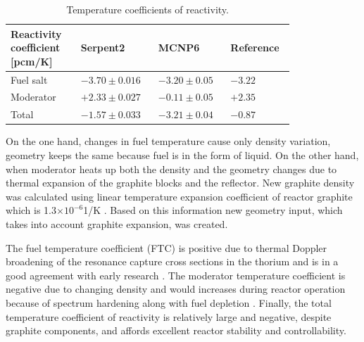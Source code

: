 \documentclass{anstrans}
\begin{document}
\captionsetup[table]{
  labelsep = newline,
  name = TABLE, 
  justification=justified,
  singlelinecheck=false,%
  labelsep=colon,%
  skip = \medskipamount}
\begin{table}[h!]
  \caption{Temperature coefficients of reactivity.}
\begin{tabular}{p{0.22\linewidth} p{0.22\linewidth} p{0.21\linewidth} p{0.15\linewidth}} \toprule
   Reactivity coefficient [pcm/K]  & Serpent2      & MCNP6 \cite{park_whole_2015}   & Reference \cite{robertson_conceptual_1971}      
\\ \midrule
Fuel salt        & $-3.70\pm0.016$ & $-3.20\pm0.05$ & $-3.22$ 
\\ \midrule
Moderator        & $+2.33\pm0.027$ & $-0.11\pm0.05$ & $+2.35$ 
\\ \midrule
Total            & $-1.57\pm0.033$ & $-3.21\pm0.04$ & $-0.87$ 
\\
\bottomrule
\end{tabular}
  \label{tab:tcoef}
\end{table}
On the one hand, changes in fuel temperature cause only density variation, geometry keeps the same because fuel is in the form of liquid. On the other hand, when moderator heats up both the density and the geometry changes due to thermal expansion of the graphite blocks and the reflector. New graphite density was calculated using linear temperature expansion coefficient of reactor graphite which is 1.3$\times10^{-6}$1/K \cite{robertson_conceptual_1971}. Based on this information new geometry input, which takes into account graphite expansion, was created.

The fuel temperature coefficient (FTC) is positive due to thermal Doppler broadening of the resonance capture cross sections in the thorium and is in a good agreement with early research \cite{robertson_conceptual_1971,park_whole_2015}. The moderator temperature coefficient is negative due to changing density and would increases during reactor operation because of spectrum hardening along with fuel depletion \cite{park_whole_2015}. Finally, the total temperature coefficient of reactivity is relatively large and negative, despite graphite components, and affords excellent reactor stability and controllability.
\end{document}
